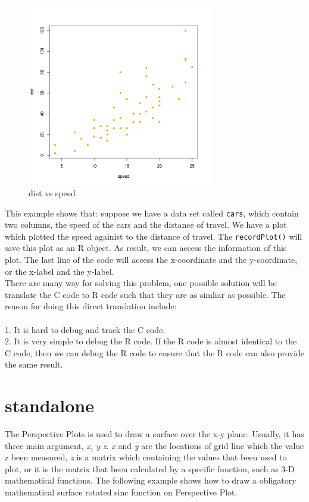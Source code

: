 \documentclass[a4paper,10pt]{article}
\begin{document}
\begin{figure}[h]
\begin{center}
  \includegraphics[height = 8cm, width = 8cm]{figure/report_3}
  \caption{dist vs speed}
  	\label{figure4}
\end{center}
\end{figure}


This example shows that: suppose we have a data set called \texttt{cars}, which contain two columns, the speed of the cars and the distance of travel. We have a plot which plotted the speed againist to the distance of travel. The \texttt{recordPlot()} will save this plot as an R object. As result, we can access the information of this plot. The last line of the code will access the x-coordinate and the y-coordinate, or the x-label and the y-label. \\

There are many way for solving this problem, one possible solution will be translate the C code to R code such that they are as simliar as possible. The reason for doing this direct translation include: \\\\
1. It is hard to debug and track the C code. \\
2. It is very simple to debug the R code. If the R code is almost identical to the C code, then we can debug the R code to ensure that the R code can also provide the same result. \\

\newpage
\section{standalone}
The Perspective Plots is used to draw a surface over the x-y plane. Usually, it has three main argument, \emph{x, y z}. \emph{x} and \emph{y} are the locations of grid line which the value z been measured, \emph{z} is a matrix which containing the values that been used to plot, or it is the matrix that been calculated by a specific function, such as 3-D mathematical functions. The following example shows how to draw a obligatory mathematical surface rotated sinc function on Perspective Plot.\\
\end{document}
